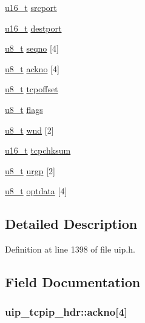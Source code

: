 \begin{DoxyCompactItemize}
\item 
\hyperlink{group__uipfw_ga77570ac4fcab86864fa1916e55676da2}{u16\_\-t} \hyperlink{structuip__tcpip__hdr_aa81fff4836049cb3c018304d77337554}{srcport}
\item 
\hyperlink{group__uipfw_ga77570ac4fcab86864fa1916e55676da2}{u16\_\-t} \hyperlink{structuip__tcpip__hdr_a025ffa46b799fa6952719c499a3ae17c}{destport}
\item 
\hyperlink{group__uipfw_ga4caecabca98b43919dd11be1c0d4cd8e}{u8\_\-t} \hyperlink{structuip__tcpip__hdr_a2541fae506eb111ff1be2372e0919839}{seqno} \mbox{[}4\mbox{]}
\item 
\hyperlink{group__uipfw_ga4caecabca98b43919dd11be1c0d4cd8e}{u8\_\-t} \hyperlink{structuip__tcpip__hdr_a71721395f1c7c42b8bcc111b339bea7c}{ackno} \mbox{[}4\mbox{]}
\item 
\hyperlink{group__uipfw_ga4caecabca98b43919dd11be1c0d4cd8e}{u8\_\-t} \hyperlink{structuip__tcpip__hdr_a6af8a59d0ab8967aacea749d6e59ac90}{tcpoffset}
\item 
\hyperlink{group__uipfw_ga4caecabca98b43919dd11be1c0d4cd8e}{u8\_\-t} \hyperlink{structuip__tcpip__hdr_a619d9755a5d4aaabdb2e5e6ea4c1e0bf}{flags}
\item 
\hyperlink{group__uipfw_ga4caecabca98b43919dd11be1c0d4cd8e}{u8\_\-t} \hyperlink{structuip__tcpip__hdr_a7f0ab3fe3bcf1e3ed9f5950cb4474ec1}{wnd} \mbox{[}2\mbox{]}
\item 
\hyperlink{group__uipfw_ga77570ac4fcab86864fa1916e55676da2}{u16\_\-t} \hyperlink{structuip__tcpip__hdr_af4a1d8cfbe270393a2de02b0c743e474}{tcpchksum}
\item 
\hyperlink{group__uipfw_ga4caecabca98b43919dd11be1c0d4cd8e}{u8\_\-t} \hyperlink{structuip__tcpip__hdr_adc7001682017599549f57771f4cd1b9a}{urgp} \mbox{[}2\mbox{]}
\item 
\hyperlink{group__uipfw_ga4caecabca98b43919dd11be1c0d4cd8e}{u8\_\-t} \hyperlink{structuip__tcpip__hdr_adde3cf9a57445814d01b3c67da08afdb}{optdata} \mbox{[}4\mbox{]}
\end{DoxyCompactItemize}


\subsection{Detailed Description}


Definition at line 1398 of file uip.h.



\subsection{Field Documentation}
\hypertarget{structuip__tcpip__hdr_a71721395f1c7c42b8bcc111b339bea7c}{
\subsubsection[{ackno}]{ {\bf uip\_\-tcpip\_\-hdr::ackno}\mbox{[}4\mbox{]}}}
\label{structuip__tcpip__hdr_a71721395f1c7c42b8bcc111b339bea7c}


